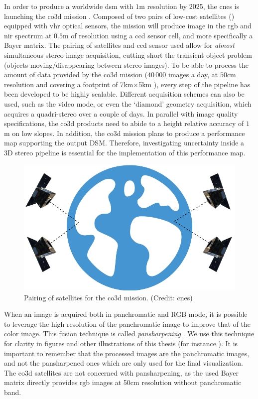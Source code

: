 In order to produce a worldwide \acrshort{dsm} with $1$m resolution by 2025, the \acrfull{cnes} is launching the \acrfull{co3d} mission \cite{melet_co3d_2020}. Composed of two pairs of low-cost satellites () equipped with \acrshort{vhr} optical sensors, the mission will produce image in the \acrshort{rgb} and \acrshort{nir} spectrum at $0.5$m of resolution \cite{lebegue_co3d_2020} using a \acrshort{ccd} sensor cell, and more specifically a Bayer matrix. The pairing of satellites and \acrshort{ccd} sensor used allow for \textit{almost} simultaneous stereo image acquisition, cutting short the transient object problem (\ie objects moving/disappearing between stereo images). To be able to process the amount of data provided by the \acrshort{co3d} mission ($40\,000$ images a day, at $50$cm resolution and covering a footprint of 7km$\times$5km \cite{melet_co3d_2020, lebegue_co3d_2020}), every step of the pipeline has been developed to be highly scalable. Different acquisition schemes can also be used, such as the video mode, or even the `diamond' geometry acquisition, which acquires a quadri-stereo over a couple of days. In parallel with image quality specifications, the \acrshort{co3d} products need to abide to a height relative accuracy of $1$m on low slopes. In addition, the \acrshort{co3d} mission plans to produce a performance map supporting the output DSM. Therefore, investigating uncertainty inside a 3D stereo pipeline is essential for the implementation of this performance map.

\begin{figure}
    \centering
    \includegraphics[width=0.6\linewidth]{Images/Chap_1/CO3D_schema.png}
    \caption{Pairing of satellites for the \acrshort{co3d} mission. (Credit: \acrshort{cnes})}
    \label{fig:co3d_mission}
\end{figure}

\begin{remark}
    When an image is acquired both in panchromatic and RGB mode, it is possible to leverage the high resolution of the panchromatic image to improve that of the color image. This fusion technique is called \textit{pansharpening} \cite{loncan_hyperspectral_2015}. We use this technique for clarity in figures and other illustrations of this thesis (for instance ). It is important to remember that the processed images are the panchromatic images, and not the pansharpened ones which are only used for the final visualization. The \acrshort{co3d} satellites are not concerned with pansharpening, as the used Bayer matrix directly provides \acrshort{rgb} images at 50cm resolution without panchromatic band.
\end{remark} 

